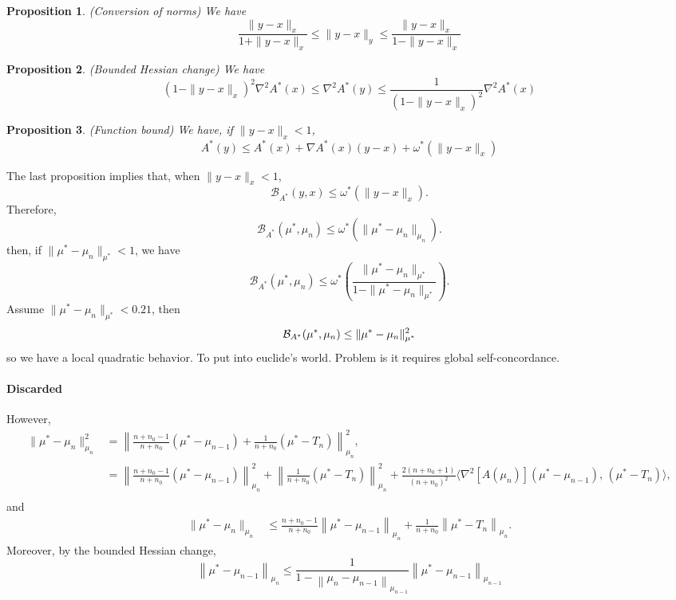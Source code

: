 \documentclass{article}
\newtheorem{proposition}{Proposition}
\newcommand{\logpart}{A}
\newcommand{\bregmanconj}{\cB_{\logpart^*}}
\begin{document}
\begin{proposition}
    (Conversion of norms) We have
    \[
        \frac{\|y-x\|_x}{1+\|y-x\|_x} \leq \|y-x\|_y \leq \frac{\|y-x\|_x}{1-\|y-x\|_x}
    \]
\end{proposition}


\begin{proposition}
    (Bounded Hessian change) We have
    \[
        (1-\|y-x\|_x)^2 \nabla^2 A^*(x) \leq \nabla^2 A^*(y) \leq \frac{1}{(1-\|y-x\|_x)^2} \nabla^2 A^*(x)
    \]
\end{proposition}


\begin{proposition}
    (Function bound) We have, if $\|y-x\|_x < 1$,
    \[
        A^*(y) \leq A^*(x) + \nabla A^*(x)(y-x) + \omega^*(\|y-x\|_x)
    \]
\end{proposition}

The last proposition implies that, when $\|y-x\|_x < 1$,
\[
    \mathcal{B}_{A^*}(y,x) \leq \omega^*(\|y-x\|_x).
\]
Therefore,
\[
    \mathcal{B}_{A^*}(\mu^*,\mu_n) \leq \omega^*(\|\mu^*-\mu_n\|_{\mu_n}) .
\]
then, if $\|\mu^*-\mu_n\|_{\mu^*} < 1$, we have
\[
    \mathcal{B}_{A^*}(\mu^*,\mu_n) \leq \omega^*\left(\frac{\|\mu^*-\mu_n\|_{\mu^*}}{1-\|\mu^*-\mu_n\|_{\mu^*}}\right) .
\]
Assume $\|\mu^*-\mu_n\|_{\mu^*} < 0.21$, then
\[
    \bregmanconj(\mu^*,\mu_n) \leq \|\mu^*-\mu_n\|_{\mu^*}^2
\]
so we have a local quadratic behavior. To put into euclide's world. Problem is it requires global self-concordance.

\paragraph{Discarded}
However,
\begin{align*}
    \|\mu^*-\mu_n\|^2_{\mu_n} & = \left\|\frac{n+n_0-1}{n+n_0}(\mu^*-\mu_{n-1}) + \frac{1}{n+n_0}(\mu^*-T_n)\right\|^2_{\mu_n},\\
    & = \left\|\frac{n+n_0-1}{n+n_0}(\mu^*-\mu_{n-1})\right\|_{\mu_n}^2 +  \left\|\frac{1}{n+n_0}(\mu^*-T_n)\right\|^2_{\mu_n} + \frac{2(n+n_0+1)}{(n+n_0)^2}\langle \nabla^2 [A(\mu_n)](\mu^*-\mu_{n-1}),\,(\mu^*-T_n) \rangle,\\
\end{align*}
and
\begin{align*}
    \|\mu^*-\mu_n\|_{\mu_n} & \leq  \frac{n+n_0-1}{n+n_0}\left\|\mu^*-\mu_{n-1}\right\|_{\mu_n} + \frac{1}{n+n_0}\left\|\mu^*-T_n\right\|_{\mu_n} .
\end{align*}
Moreover, by the bounded Hessian change,
\[
    \left\|\mu^*-\mu_{n-1}\right\|_{\mu_n} \leq \frac{1}{1-\left\|\mu_n-\mu_{n-1}\right\|_{\mu_{n-1}}}\left\|\mu^*-\mu_{n-1}\right\|_{\mu_{n-1}}
\]
    
\end{document}
